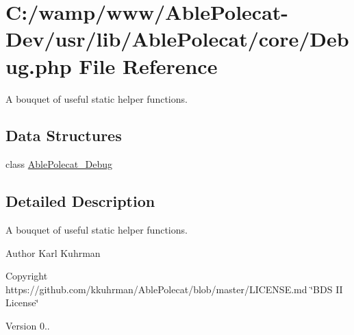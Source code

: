 \hypertarget{_debug_8php}{}\section{C\+:/wamp/www/\+Able\+Polecat-\/\+Dev/usr/lib/\+Able\+Polecat/core/\+Debug.php File Reference}
\label{_debug_8php}


A bouquet of useful static helper functions.  


\subsection*{Data Structures}
\begin{DoxyCompactItemize}
\item 
class \hyperlink{class_able_polecat___debug}{Able\+Polecat\+\_\+\+Debug}
\end{DoxyCompactItemize}


\subsection{Detailed Description}
A bouquet of useful static helper functions. 

\begin{DoxyAuthor}{Author}
Karl Kuhrman 
\end{DoxyAuthor}
\begin{DoxyCopyright}{Copyright}
https\+://github.com/kkuhrman/\+Able\+Polecat/blob/master/\+L\+I\+C\+E\+N\+S\+E.\+md \char`\"{}\+B\+D\+S I\+I License\char`\"{} 
\end{DoxyCopyright}
\begin{DoxyVersion}{Version}
0.. 
\end{DoxyVersion}
